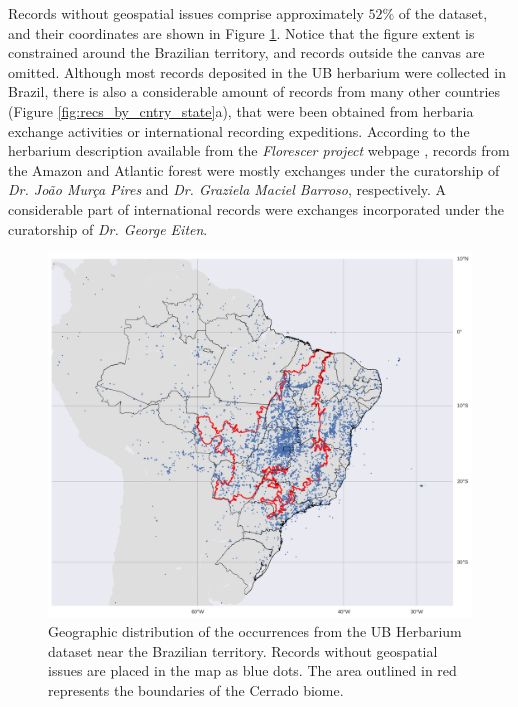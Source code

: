 Records without geospatial issues comprise approximately $52\%$ of the dataset, and their coordinates are shown in Figure \ref{fig:occurrence_map}. Notice that the figure extent is constrained around the Brazilian territory, and records outside the canvas are omitted. Although most records deposited in the UB herbarium were collected in Brazil, there is also a considerable amount of records from many other countries (Figure \ref{fig:recs_by_cntry_state}a), that were been obtained from herbaria exchange activities or international recording expeditions. According to the herbarium description available from the \textit{Florescer project} webpage \cite{florescer}, records from the Amazon and Atlantic forest were mostly exchanges under the curatorship of \textit{Dr. João Murça Pires} and \textit{Dr. Graziela Maciel Barroso}, respectively. A considerable part of international records were exchanges incorporated under the curatorship of \textit{Dr. George Eiten}.  


  \begin{figure}[!htb]
  	\centering
    \includegraphics[width=0.7\linewidth]{figures/occurrence_map.png}
    \caption{Geographic distribution of the occurrences from the UB Herbarium dataset near the Brazilian territory. Records without geospatial issues are placed in the map as blue dots. The area outlined in red represents the boundaries of the Cerrado biome.}
    \label{fig:occurrence_map}
  \end{figure}
  
